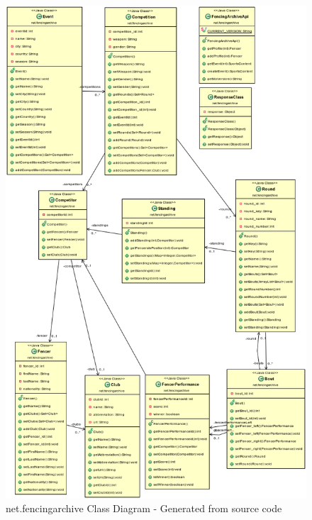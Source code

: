\begin{figure}[!ht]
  \centering
  \includegraphics[width=\textwidth,height=0.9\textheight,keepaspectratio]{ObjectAid/class-diagram.png}
  \caption{net.fencingarchive Class Diagram - Generated from source code}
  \label{fig:classDiagramGeneratedNetFencingarchive}
\end{figure}

